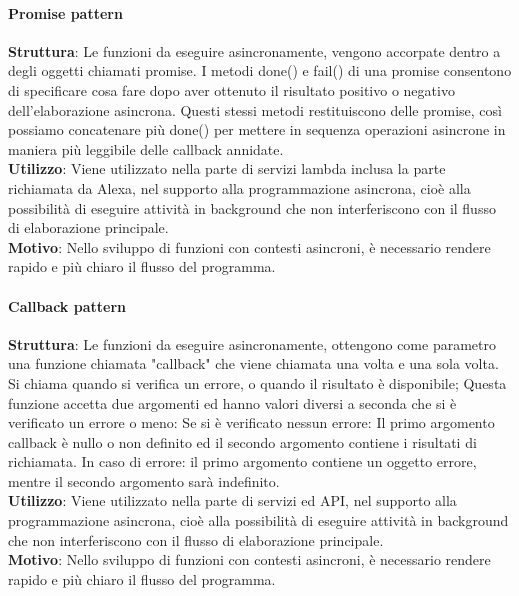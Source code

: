 \documentclass[../DefinizioneDiProdotto_v2.0.0.tex]{subfiles}
\begin{document}
\paragraph{Promise pattern}\mbox{}
\begin{addmargin}[1em]{2em}%
	\textbf{Struttura}: Le funzioni da eseguire asincronamente, vengono accorpate dentro a degli oggetti chiamati promise. I metodi done() e fail() di una promise consentono di specificare cosa fare dopo aver ottenuto il risultato positivo o negativo dell’elaborazione asincrona. Questi stessi metodi restituiscono delle promise, così possiamo concatenare più done() per mettere in sequenza operazioni asincrone in maniera più leggibile delle callback annidate.\\
	\textbf{Utilizzo}: Viene utilizzato nella parte di servizi lambda inclusa la parte richiamata da Alexa, nel supporto alla programmazione asincrona, cioè alla possibilità di eseguire attività in background che non interferiscono con il flusso di elaborazione principale.\\
	\textbf{Motivo}: Nello sviluppo di funzioni con contesti asincroni, è necessario rendere rapido e più chiaro il flusso del programma.\\
\end{addmargin}

\paragraph{Callback pattern}\mbox{}
\begin{addmargin}[1em]{2em}%
	\textbf{Struttura}: Le funzioni da eseguire asincronamente, ottengono come parametro una funzione chiamata "callback" che viene chiamata una volta e una sola volta. Si chiama quando si verifica un errore, o quando il risultato è disponibile; Questa funzione accetta due argomenti ed hanno valori diversi a seconda che si è verificato un errore o meno:
		Se si è verificato nessun errore:
		Il primo argomento callback è nullo o non definito ed il secondo argomento contiene i risultati di richiamata.
		In caso di errore:
		il primo argomento contiene un oggetto errore, mentre il secondo argomento sarà indefinito. \\
	\textbf{Utilizzo}: Viene utilizzato nella parte di servizi ed API, nel supporto alla programmazione asincrona, cioè alla possibilità di eseguire attività in background che non interferiscono con il flusso di elaborazione principale.\\
	\textbf{Motivo}: Nello sviluppo di funzioni con contesti asincroni, è necessario rendere rapido e più chiaro il flusso del programma.\\
\end{addmargin}
\end{document}
